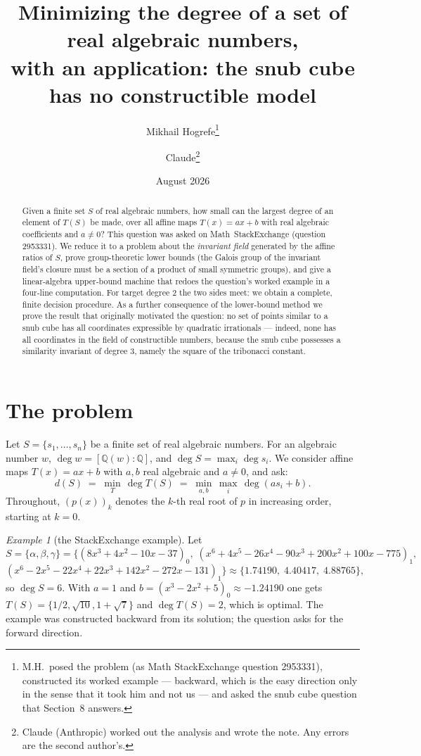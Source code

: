 \documentclass[11pt]{article}
\title{Minimizing the degree of a set of real algebraic numbers,\\
with an application: the snub cube has no constructible model}
\author{Mikhail Hogrefe\thanks{M.H.\ posed the problem (as Math StackExchange question
2953331), constructed its worked example --- backward, which is the easy direction only in the
sense that it took him and not us --- and asked the snub cube question that
Section~8 answers.}
\and Claude\thanks{Claude (Anthropic) worked out the analysis and wrote the note. Any errors
are the second author's.}}
\date{August 2026}
\theoremstyle{definition}
\theoremstyle{remark}
\newtheorem{example}[theorem]{Example}
\newcommand{\Q}{\mathbb{Q}}
\begin{document}
\maketitle

\begin{abstract}
Given a finite set $S$ of real algebraic numbers, how small can the largest degree of an element
of $T(S)$ be made, over all affine maps $T(x) = ax + b$ with real algebraic coefficients and
$a \neq 0$? This question was asked on Math~StackExchange (question 2953331). We reduce it to a
problem about the \emph{invariant field} generated by the affine ratios of $S$, prove
group-theoretic lower bounds (the Galois group of the invariant field's closure must be a
section of a product of small symmetric groups), and give a linear-algebra upper-bound machine
that redoes the question's worked example in a four-line computation. For target degree $2$ the
two sides meet: we obtain a complete, finite decision procedure. As a further consequence of the
lower-bound method we prove the result that originally motivated the question: no set of points
similar to a snub cube has all coordinates expressible by quadratic irrationals --- indeed, none
has all coordinates in the field of constructible numbers, because the snub cube possesses a
similarity invariant of degree $3$, namely the square of the tribonacci constant.
\end{abstract}

\section{The problem}

Let $S = \{s_1, \dots, s_n\}$ be a finite set of real algebraic numbers. For an algebraic
number $w$, $\deg w = [\Q(w) : \Q]$, and $\deg S = \max_i \deg s_i$. We consider affine maps
$T(x) = ax + b$ with $a, b$ real algebraic and $a \neq 0$, and ask:
\[
d(S) \;=\; \min_T \, \deg T(S) \;=\; \min_{a, b} \, \max_i \, \deg(a s_i + b).
\]
Throughout, $(p(x))_k$ denotes the $k$-th real root of $p$ in increasing order, starting at
$k = 0$.

\begin{example}[the StackExchange example]\label{ex:mse}
Let
\[
S = \bigl\{ \alpha, \beta, \gamma \bigr\}
= \bigl\{ (8x^3+4x^2-10x-37)_0,\;
(x^6+4x^5-26x^4-90x^3+200x^2+100x-775)_1,\;
\]
\[
(x^6-2x^5-22x^4+22x^3+142x^2-272x-131)_1 \bigr\}
\approx \{1.74190,\; 4.40417,\; 4.88765\},
\]
so $\deg S = 6$. With $a = 1$ and $b = (x^3-2x^2+5)_0 \approx -1.24190$ one gets
$T(S) = \{1/2, \sqrt{10}, 1+\sqrt7\}$ and $\deg T(S) = 2$, which is optimal. The example was
constructed backward from its solution; the question asks for the forward direction.
\end{example}
\end{document}

